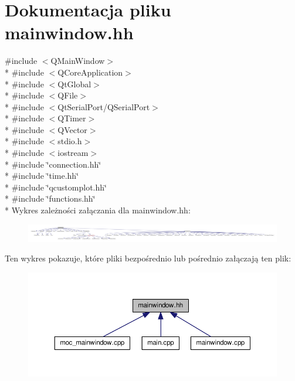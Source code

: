 \hypertarget{mainwindow_8hh}{}\section{Dokumentacja pliku mainwindow.\+hh}
\label{mainwindow_8hh}
{\ttfamily \#include $<$Q\+Main\+Window$>$}\\*
{\ttfamily \#include $<$Q\+Core\+Application$>$}\\*
{\ttfamily \#include $<$Qt\+Global$>$}\\*
{\ttfamily \#include $<$Q\+File$>$}\\*
{\ttfamily \#include $<$Qt\+Serial\+Port/\+Q\+Serial\+Port$>$}\\*
{\ttfamily \#include $<$Q\+Timer$>$}\\*
{\ttfamily \#include $<$Q\+Vector$>$}\\*
{\ttfamily \#include $<$stdio.\+h$>$}\\*
{\ttfamily \#include $<$iostream$>$}\\*
{\ttfamily \#include \char`\"{}connection.\+hh\char`\"{}}\\*
{\ttfamily \#include \char`\"{}time.\+hh\char`\"{}}\\*
{\ttfamily \#include \char`\"{}qcustomplot.\+hh\char`\"{}}\\*
{\ttfamily \#include \char`\"{}functions.\+hh\char`\"{}}\\*
Wykres zależności załączania dla mainwindow.\+hh\+:\nopagebreak
\begin{figure}[H]
\begin{center}
\leavevmode
\includegraphics[width=350pt]{mainwindow_8hh__incl}
\end{center}
\end{figure}
Ten wykres pokazuje, które pliki bezpośrednio lub pośrednio załączają ten plik\+:\nopagebreak
\begin{figure}[H]
\begin{center}
\leavevmode
\includegraphics[width=350pt]{mainwindow_8hh__dep__incl}
\end{center}
\end{figure}
